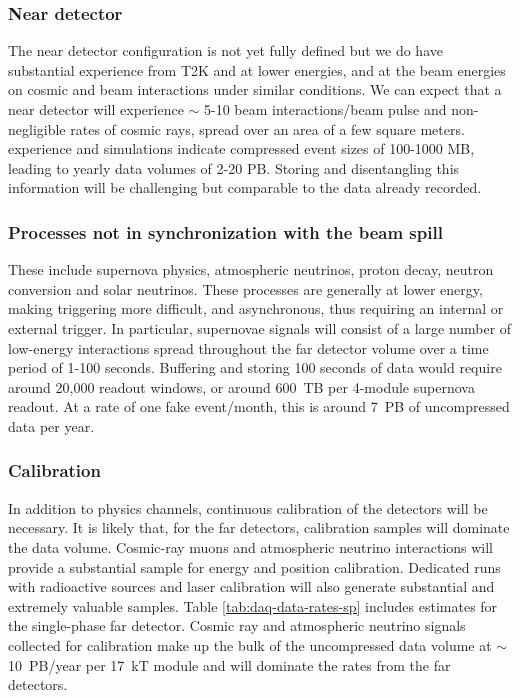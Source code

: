 \subsubsection{ Near detector} The near detector configuration is not yet fully defined  but we do have substantial experience from T2K and   at lower energies, and   at the   beam energies on cosmic and beam interactions under similar conditions.  We can expect that a near detector will experience $\sim$ 5-10 beam interactions/beam pulse and non-negligible rates of cosmic rays, spread over an area of a few square meters.  experience and  simulations indicate compressed event sizes of 100-1000 MB, leading to yearly data volumes of 2-20 PB.  Storing and disentangling this information will be challenging but comparable to the  data already recorded. 








\subsubsection{Processes not in synchronization with the beam spill} These include supernova physics, atmospheric neutrinos, proton decay, neutron conversion and solar neutrinos.  These processes are generally at lower energy, making triggering more difficult, and asynchronous, thus requiring an internal or external trigger.  In particular, supernovae signals will consist of a large number of low-energy interactions spread throughout the far detector volume over a time period of 1-100 seconds. Buffering and storing 100 seconds of data would require around 20,000 readout windows, or around 600~TB per 4-module supernova readout.  At a rate of one fake  event/month, this is around 7~PB of uncompressed data per year. 

\subsubsection{
Calibration}
In addition to physics channels, continuous calibration of the detectors will be necessary.  It is likely that, for the far detectors, calibration samples will  dominate the data volume. Cosmic-ray muons and atmospheric neutrino interactions will provide a substantial sample for energy and position calibration.  Dedicated runs with radioactive sources and laser calibration will also generate substantial and extremely valuable samples. Table \ref{tab:daq-data-rates-sp} includes estimates for the single-phase far detector.   Cosmic ray and atmospheric neutrino signals collected for calibration make up the bulk of the uncompressed  data volume at $\sim$ 10~PB/year per 17~kT module and will dominate the rates from the far detectors.  













